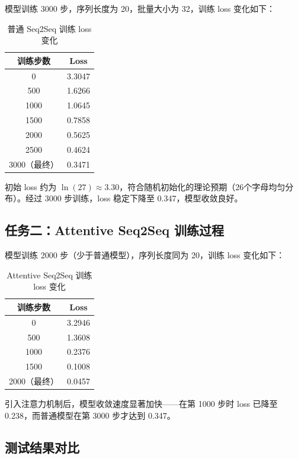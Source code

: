 \documentclass[12pt, a4paper]{article}
\begin{document}
模型训练 3000 步，序列长度为 20，批量大小为 32，训练 loss 变化如下：

\begin{table}[H]
    \centering
    \caption{普通 Seq2Seq 训练 loss 变化}
    \begin{tabular}{cc}
        \toprule
        训练步数 & Loss \\
        \midrule
        0    & 3.3047 \\
        500  & 1.6266 \\
        1000 & 1.0645 \\
        1500 & 0.7858 \\
        2000 & 0.5625 \\
        2500 & 0.4624 \\
        3000（最终） & 0.3471 \\
        \bottomrule
    \end{tabular}
\end{table}

初始 loss 约为 $\ln(27) \approx 3.30$，符合随机初始化的理论预期（26个字母均匀分布）。经过 3000 步训练，loss 稳定下降至 0.347，模型收敛良好。

\subsection{任务二：Attentive Seq2Seq 训练过程}

模型训练 2000 步（少于普通模型），序列长度同为 20，训练 loss 变化如下：

\begin{table}[H]
    \centering
    \caption{Attentive Seq2Seq 训练 loss 变化}
    \begin{tabular}{cc}
        \toprule
        训练步数 & Loss \\
        \midrule
        0    & 3.2946 \\
        500  & 1.3608 \\
        1000 & 0.2376 \\
        1500 & 0.1008 \\
        2000（最终） & 0.0457 \\
        \bottomrule
    \end{tabular}
\end{table}

引入注意力机制后，模型收敛速度显著加快——在第 1000 步时 loss 已降至 0.238，而普通模型在第 3000 步才达到 0.347。

\subsection{测试结果对比}
\end{document}
